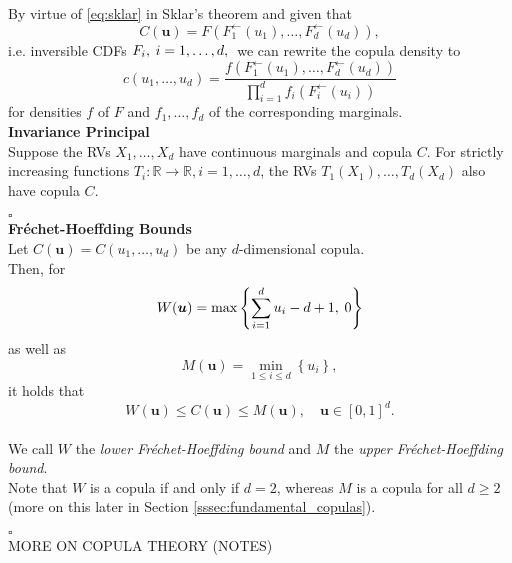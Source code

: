 By virtue of \autoref{eq:sklar} in Sklar's theorem and given that
\begin{equation} 
C(\mathbf{u})=F\left(F_{1}^{\leftarrow}\left(u_{1}\right), \ldots, F_{d}^{\leftarrow}\left(u_{d}\right)\right) ,
\label{eq:sklar_2}
\end{equation}
i.e. inversible \ac{CDF}s $ F_i, \hspace{0.25em} i = 1, \ldots, d, \hspace{0.25em}$ we can rewrite the copula density to
\begin{equation}
c\left(u_{1}, \ldots, u_{d}\right)=\frac{f\left(F_{1}^{\leftarrow}\left(u_{1}\right), \ldots, F_{d}^{\leftarrow}\left(u_{d}\right)\right)}{\prod \limits _{i=1}^{d} f_{i}\left(F_{i}^{\leftarrow}\left(u_{i}\right)\right)}
\label{eq:copula_density_2}
\end{equation}
for densities $f$ of $F$ and $f_1, \ldots, f_d$ of the corresponding marginals.\\


\textbf{Invariance Principal}\\
Suppose the \ac{RV}s $ X_1, \ldots, X_d $  have continuous marginals and copula $C$. For strictly increasing functions $T_i : \mathbb{R} \rightarrow \mathbb{R}, i = 1, \ldots, d$, the \ac{RV}s $T_1(X_1), \ldots, T_d(X_d)$ also have copula $C$.

\hfill $\square$ \\


\textbf{Fr\'echet-Hoeffding Bounds}\\
Let $C(\bm{u}) = C(u_1, \ldots, u_d)$ be any $d$-dimensional copula.\\
Then, for
\begin{equation}
W(\boldsymbol{u})=\max \left\{\sum\limits_{i=1}^{d} u_{i}-d+1, \hspace{0.25em} 0\right\}
\label{eq:frechet_hoeffding_lower}
\end{equation}
as well as
\begin{equation}
M(\boldsymbol{u})=\min \limits _{1 \leq i \leq d}\left\{u_{i}\right\},
\label{eq:frechet_hoeffding_upper}
\end{equation}
it holds that
\begin{equation}
W(\bm{u}) \leq C(\bm{u}) \leq M(\bm{u}), \quad \bm{u} \in[0,1]^{d}.
\label{eq:frechet_hoeffding}
\end{equation}\\
We call $W$ the \textit{lower Fr\'echet-Hoeffding bound} and $M$ the \textit{upper Fr\'echet-Hoeffding bound}.\\
Note that $W$ is a copula if and only if $d=2$, whereas $M$ is a copula for all $d \geq 2$ (more on this later in Section \ref{sssec:fundamental_copulas}).

\hfill $\square$ \\


MORE ON COPULA THEORY (NOTES)



